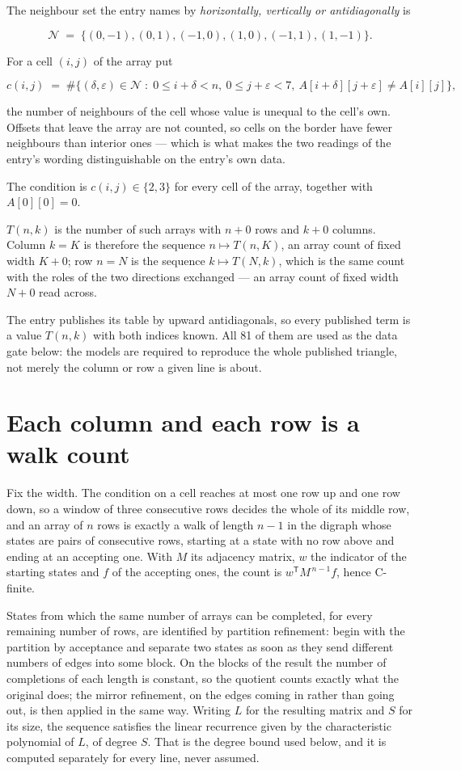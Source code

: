 \documentclass[11pt]{article}
\theoremstyle{definition}
\begin{document}
The neighbour set the entry names by {\itshape horizontally, vertically or antidiagonally} is

\[\mathcal{N} \;=\; \{(0,-1), (0,1), (-1,0), (1,0), (-1,1), (1,-1)\}.\]

For a cell $(i,j)$ of the array put

\[c(i,j) \;=\; \#\bigl\{(\delta,\varepsilon)\in\mathcal{N} \;:\; 0\le i+\delta<n,\ 0\le j+\varepsilon<7,\ A[i+\delta][j+\varepsilon] \neq A[i][j]\bigr\},\]

the number of neighbours of the cell whose value is unequal to the cell's own. Offsets that leave the array are not counted, so cells on the border have fewer neighbours than interior ones --- which is what makes the two readings of the entry's wording distinguishable on the entry's own data.

The condition is $c(i,j) \in \{2, 3\}$ for every cell of the array, together with $A[0][0]=0$.

$T(n,k)$ is the number of such arrays with $n + 0$ rows and $k + 0$ columns. Column $k = K$ is therefore the sequence $n \mapsto T(n,K)$, an array count of fixed width $K + 0$; row $n = N$ is the sequence $k \mapsto T(N,k)$, which is the same count with the roles of the two directions exchanged --- an array count of fixed width $N + 0$ read across.

The entry publishes its table by upward antidiagonals, so every published term is a value $T(n,k)$ with both indices known. All 81 of them are used as the data gate below: the models are required to reproduce the whole published triangle, not merely the column or row a given line is about.

\section{Each column and each row is a walk count}

Fix the width. The condition on a cell reaches at most one row up and one row down, so a window of three consecutive rows decides the whole of its middle row, and an array of $n$ rows is exactly a walk of length $n-1$ in the digraph whose states are pairs of consecutive rows, starting at a state with no row above and ending at an accepting one. With $M$ its adjacency matrix, $w$ the indicator of the starting states and $f$ of the accepting ones, the count is $w^{\mathsf T}M^{\,n-1}f$, hence C-finite.

States from which the same number of arrays can be completed, for every remaining number of rows, are identified by partition refinement: begin with the partition by acceptance and separate two states as soon as they send different numbers of edges into some block. On the blocks of the result the number of completions of each length is constant, so the quotient counts exactly what the original does; the mirror refinement, on the edges coming in rather than going out, is then applied in the same way. Writing $L$ for the resulting matrix and $S$ for its size, the sequence satisfies the linear recurrence given by the characteristic polynomial of $L$, of degree $S$. That is the degree bound used below, and it is computed separately for every line, never assumed.
\end{document}
